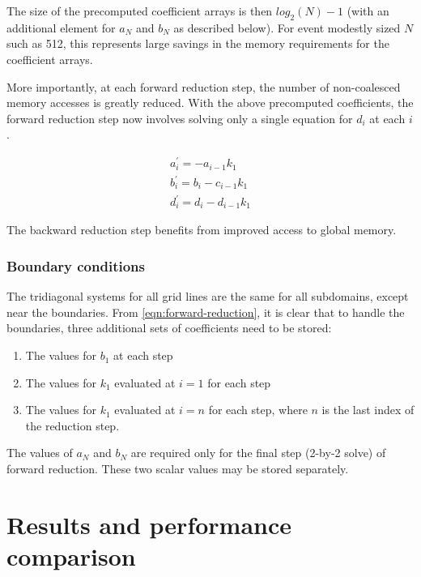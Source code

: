 \documentclass{article}
\begin{document}
        The size of the precomputed coefficient arrays is then $log_2(N)-1$
        (with an additional element for $a_N$ and $b_N$ as described below).
        For event modestly sized $N$ such as 512, this represents large savings
        in the memory requirements for the coefficient arrays.

        More importantly, at each forward reduction step,
        the number of non-coalesced memory accesses is greatly reduced.
        With the above precomputed coefficients,
        the forward reduction step now involves solving only a single equation
        for $d_i$ at each $i$.

        \begin{align} \label{eqn:forward-reduction-right}
            & a^{\prime}_i = -a_{i-1}k_1 & \\
            & b^{\prime}_i = b_i - c_{i-1}k_1 & \\
            & d^{\prime}_i = d_i - d_{i-1}k_1 &
        \end{align}

        The backward reduction step benefits from improved access to
        global memory.

        \subsubsection*{Boundary conditions}

        The tridiagonal systems for all grid lines are the same for all subdomains,
        except near the boundaries.
        From \ref{eqn:forward-reduction}, it is clear that
        to handle the boundaries, three additional sets of coefficients
        need to be stored:

        \begin{enumerate}
         \item The values for $b_1$ at each step
         \item The values for $k_1$ evaluated at $i=1$ for each step
         \item The values for $k_1$ evaluated at $i=n$ for each step,
            where $n$ is the last index of the reduction step.
        \end{enumerate}

        The values of $a_N$ and $b_N$ are required only for the
        final step (2-by-2 solve) of forward reduction.
        These two scalar values may be stored separately.

\section{Results and performance comparison}
    
\end{document}
